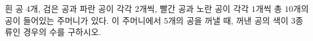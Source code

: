 \hspace*{2mm}\begin{minipage}[t]{\dimexpr\linewidth-2mm\relax}\vspace{0pt}
흰 공 $4$개, 검은 공과 파란 공이 각각 $2$개씩, 빨간 공과 노란 공이 각각 $1$개씩 총 $10$개의 공이 들어있는 주머니가 있다. 이 주머니에서 $5$개의 공을 꺼낼 때, 꺼낸 공의 색이 $3$종류인 경우의 수를 구하시오. \end{minipage}
